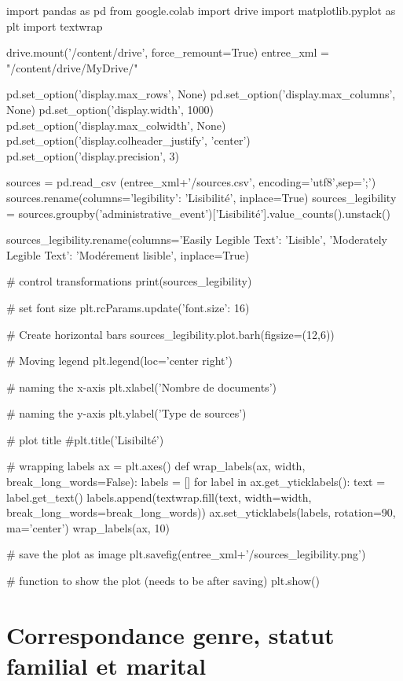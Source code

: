 \documentclass[a4paper,12pt,twoside]{book}
\begin{document}
		    \begin{python}
import pandas as pd
from google.colab import drive
import matplotlib.pyplot as plt
import textwrap

drive.mount('/content/drive', force_remount=True)
entree_xml = "/content/drive/MyDrive/"

pd.set_option('display.max_rows', None)
pd.set_option('display.max_columns', None)
pd.set_option('display.width', 1000)
pd.set_option('display.max_colwidth', None)
pd.set_option('display.colheader_justify', 'center')
pd.set_option('display.precision', 3)

sources = pd.read_csv (entree_xml+'/sources.csv', encoding='utf8',sep=';')
sources.rename(columns={'legibility': 'Lisibilité'}, inplace=True)
sources_legibility = sources.groupby('administrative_event')['Lisibilité'].value_counts().unstack()

sources_legibility.rename(columns={'Easily Legible Text': 'Lisible',
'Moderately Legible Text': 'Modérement lisible'}, inplace=True)

# control transformations
print(sources_legibility)

# set font size
plt.rcParams.update({'font.size': 16})

# Create horizontal bars
sources_legibility.plot.barh(figsize=(12,6))

# Moving legend
plt.legend(loc='center right')

# naming the x-axis
plt.xlabel('Nombre de documents')

# naming the y-axis
plt.ylabel('Type de sources')

# plot title
#plt.title('Lisibilté')

# wrapping labels
ax = plt.axes()
def wrap_labels(ax, width, break_long_words=False):
    labels = []
    for label in ax.get_yticklabels():
        text = label.get_text()
        labels.append(textwrap.fill(text, width=width,
                      break_long_words=break_long_words))
    ax.set_yticklabels(labels, rotation=90, ma='center')
wrap_labels(ax, 10)

# save the plot as image
plt.savefig(entree_xml+'/sources_legibility.png')

# function to show the plot (needs to be after saving)
plt.show()
		    \end{python}
		
		    \pagebreak   

        \section{Correspondance genre, statut familial et marital}
		
\end{document}
